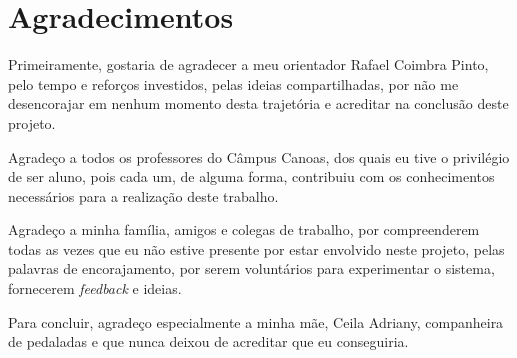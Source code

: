 \chapter*{Agradecimentos}  \label{cap:agradecimentos}
Primeiramente, gostaria de agradecer a meu orientador Rafael Coimbra Pinto, pelo tempo e reforços investidos, pelas ideias compartilhadas, por não me desencorajar em nenhum momento desta trajetória e acreditar na conclusão deste projeto. 
\par
Agradeço a todos os professores do Câmpus Canoas, dos quais eu tive o privilégio de ser aluno, pois cada um, de alguma forma, contribuiu com os conhecimentos necessários para a realização deste trabalho.
\par
Agradeço a minha família, amigos e colegas de trabalho, por compreenderem todas as vezes que eu não estive presente por estar envolvido neste projeto, pelas palavras de encorajamento, por serem voluntários para experimentar o sistema, fornecerem \textit{feedback} e ideias. 
\par
Para concluir, agradeço especialmente a minha mãe, Ceila Adriany, companheira de pedaladas e que nunca deixou de acreditar que eu conseguiria.